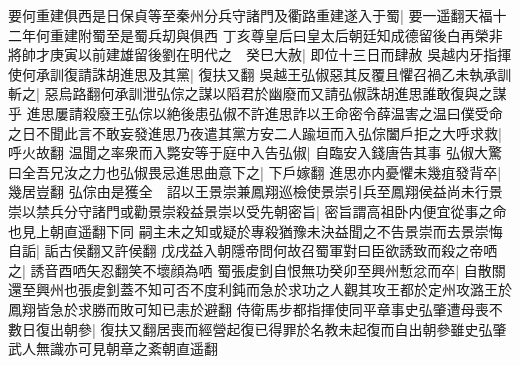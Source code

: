 要何重建俱西是日保貞等至秦州分兵守諸門及衢路重建遂入于蜀|{
	要一遥翻天福十二年何重建附蜀至是蜀兵刧與俱西}
丁亥尊皇后曰皇太后朝廷知成德留後白再榮非將帥才庚寅以前建雄留後劉在明代之　癸巳大赦|{
	即位十三日而肆赦}
吳越内牙指揮使何承訓復請誅胡進思及其黨|{
	復扶又翻}
吳越王弘俶惡其反覆且懼召禍乙未執承訓斬之|{
	惡烏路翻何承訓泄弘倧之謀以䧟君於幽廢而又請弘俶誅胡進思誰敢復與之謀乎}
進思屢請殺廢王弘倧以絶後患弘俶不許進思詐以王命密令薛温害之温曰僕受命之日不聞此言不敢妄發進思乃夜遣其黨方安二人踰垣而入弘倧闔戶拒之大呼求救|{
	呼火故翻}
温聞之率衆而入斃安等于庭中入告弘俶|{
	自臨安入錢唐告其事}
弘俶大驚曰全吾兄汝之力也弘俶畏忌進思曲意下之|{
	下戶嫁翻}
進思亦内憂懼未幾疽發背卒|{
	幾居豈翻}
弘倧由是獲全　詔以王景崇兼鳳翔巡檢使景崇引兵至鳳翔侯益尚未行景崇以禁兵分守諸門或勸景崇殺益景崇以受先朝密旨|{
	密旨謂高祖卧内便宜從事之命也見上朝直遥翻下同}
嗣主未之知或疑於專殺猶豫未決益聞之不告景崇而去景崇悔自詬|{
	詬古侯翻又許侯翻}
戊戌益入朝隱帝問何故召蜀軍對曰臣欲誘致而殺之帝哂之|{
	誘音酉哂矢忍翻笑不壞顔為哂}
蜀張䖍釗自恨無功癸卯至興州慙忿而卒|{
	自散關還至興州也張䖍釗蓋不知可否不度利鈍而急於求功之人觀其攻王都於定州攻潞王於鳳翔皆急於求勝而敗可知已恚於避翻}
侍衛馬步都指揮使同平章事史弘肇遭母喪不數日復出朝參|{
	復扶又翻居喪而經營起復已得罪於名教未起復而自出朝參雖史弘肇武人無識亦可見朝章之紊朝直遥翻}


